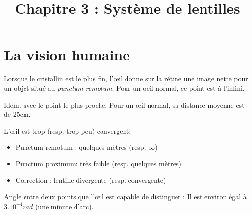 \documentclass[11pt]{article}
\title{Chapitre 3 : Système de lentilles}
\author{}
\date{}
\theoremstyle{cstyle}{\newtheorem{definition}{Définition}[section]}
\theoremstyle{cstyle}{\newtheorem{proposition}[definition]{Propriété}}
\theoremstyle{cstyle}{\newtheorem{theorem}[definition]{Théorème}}
\theoremstyle{mystyle}{\newtheorem{lemma}[definition]{Lemme}}
\theoremstyle{mystyle}{\newtheorem{corollary}[definition]{Corollaire}}
\theoremstyle{mystyle}{\newtheorem*{remark}{Remarque}}
\theoremstyle{mystyle}{\newtheorem*{remarks}{Remarques}}
\theoremstyle{mystyle}{\newtheorem*{example}{Exemple}}
\theoremstyle{mystyle}{\newtheorem*{examples}{Exemples}}
\theoremstyle{definition}{\newtheorem*{exercise}{Exercice}}
\theoremstyle{mystyle}{\newtheorem*{methode}{Méthode}}
\theoremstyle{cstyle}{\newtheorem*{cthm}{}}
\theoremstyle{warn}
\begin{document}
	
	\maketitle
	
	\begin{minipage}[t]{0.46\textwidth}
		\section{La vision humaine}		
		
		\begin{definition}
			Lorsque le cristallin est le plus fin, l'œil donne sur la rétine une image nette pour un objet situé au \textit{punctum remotum}. Pour un oeil normal, ce point est à l'infini.
		\end{definition}
	
		\begin{definition}
			Idem, avec le point le plus proche. Pour un œil normal, sa distance moyenne est de 25cm. 
		\end{definition}
	
		\begin{definition}
			L'œil est trop (resp. trop peu) convergent: 
			\begin{itemize}
				\renewcommand{\labelitemi}{$\circ$}
				\item Punctum remotum : quelques mètres (resp. \(\infty\))
				\item Punctum proximum: très faible (resp. quelques mètres)
				\item Correction : lentille divergente (resp. convergente)
			\end{itemize}
		\end{definition}
	
		\begin{definition}
			Angle entre deux points que l'œil est capable de distinguer : Il est environ égal à \(3.10^{-4}rad\) (une minute d'arc).
		\end{definition}
	\end{minipage}
	\hfill
\end{document}
